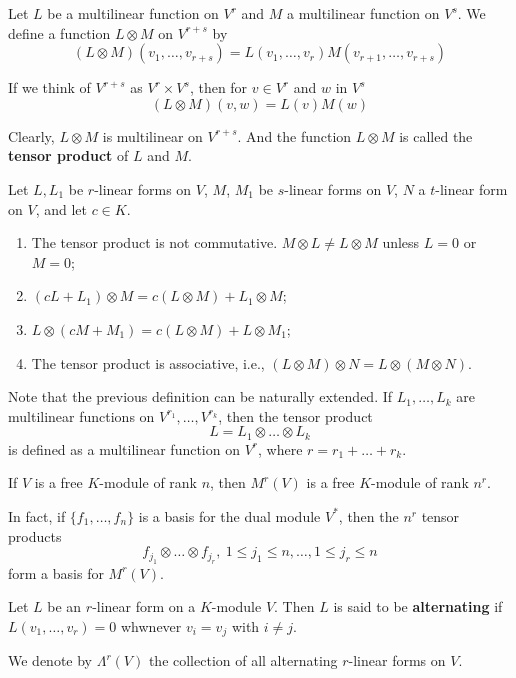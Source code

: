 \begin{definition}
	Let $L$ be a multilinear function on $V^r$ and $M$ a multilinear function on $V^s$. We define a function $L \otimes M$ on $V^{r+s}$ by
	\[
		(L \otimes M)(v_1, \ldots, v_{r+s}) = L(v_1, \ldots, v_r) M (v_{r+1}, \ldots, v_{r+s})
	\]
	
	If we think of $V^{r+s}$ as $V^r \times V^s$, then for $v \in V^r$ and $w$ in $V^s$
	\[
		(L \otimes M)(v, w) = L(v)M(w)
	\]
	
	Clearly, $L \otimes M$ is multilinear on $V^{r+s}$. And the function $L \otimes M$ is called the \textbf{tensor product} of $L$ and $M$.
\end{definition}

\begin{lemma}
	Let $L, L_1$ be $r$-linear forms on $V$, $M$, $M_1$ be $s$-linear forms on $V$, $N$ a $t$-linear form on $V$, and let $c \in K$.
	
	\begin{enumerate}
		\item The tensor product is not commutative. $M \otimes L \neq L \otimes M$ unless $L = 0$ or $M = 0$;
		\item $(cL+L_1) \otimes M = c(L \otimes M) + L_1 \otimes M$;
		\item $L \otimes (cM + M_1) = c(L \otimes M) + L \otimes M_1$;
		\item The tensor product is associative, i.e., $(L \otimes M) \otimes N = L \otimes (M \otimes N)$.
	\end{enumerate}
\end{lemma}

Note that the previous definition can be naturally extended. If $L_1, \ldots, L_k$ are multilinear functions on $V^{r_1}, \ldots, V^{r_k}$, then the tensor product
\[
	L = L_1 \otimes \ldots \otimes L_k
\]
is defined as a multilinear function on $V^r$, where $r = r_1 + \ldots + r_k$.

\begin{theorem}
	If $V$ is a free $K$-module of rank $n$, then $M^r(V)$ is a free $K$-module of rank $n^r$.
	
	In fact, if $\{ f_1, \ldots, f_n \}$ is a basis for the dual module $V^\ast$, then the $n^r$ tensor products
	\[
		f_{j_1} \otimes \ldots \otimes f_{j_r}, ~1 \leq j_1 \leq n, \ldots, 1 \leq j_r \leq n
	\]
	form a basis for $M^r(V)$.
\end{theorem}

\begin{definition}
	Let $L$ be an $r$-linear form on a $K$-module $V$. Then $L$ is said to be \textbf{alternating} if $L(v_1, \ldots, v_r) = 0$ whwnever $v_i = v_j$ with $i \neq j$.
	
	We denote by $\Lambda^r(V)$ the collection of all alternating $r$-linear forms on $V$.
\end{definition}

